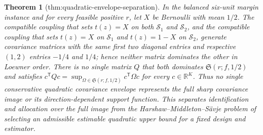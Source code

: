 \documentclass{article}
\newtheorem{theorem}{Theorem}
\begin{document}
\begin{theorem}[thm:quadratic-envelope-separation]\label{thm:quadratic-envelope-separation}
In the balanced six-unit margin instance and for every feasible positive \(r\), let \(X\) be Bernoulli with mean \(1/2\). The compatible coupling that sets \(t(z)=X\) on both \(\mathcal S_1\) and \(\mathcal S_2\), and the compatible coupling that sets \(t(z)=X\) on \(\mathcal S_1\) and \(t(z)=1-X\) on \(\mathcal S_2\), generate covariance matrices with the same first two diagonal entries and respective \((1,2)\) entries \(-1/4\) and \(1/4\); hence neither matrix dominates the other in Loewner order. There is no single matrix \(Q\) that both dominates \(\mathfrak S(r;f,1/2)\) and satisfies \(c^{\mathsf T}Qc=\sup_{\Omega\in\mathfrak S(r;f,1/2)}c^{\mathsf T}\Omega c\) for every \(c\in\mathbb R^K\). Thus no single conservative quadratic covariance envelope represents the full sharp covariance image or its direction-dependent support function. This separates identification and allocation over the full image from the Harshaw--Middleton--Sävje problem of selecting an admissible estimable quadratic upper bound for a fixed design and estimator.
\end{theorem}
\end{document}
